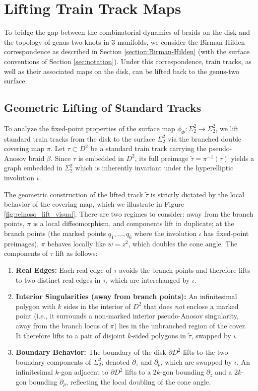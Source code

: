 \section{Lifting Train Track Maps}
\label{sec:lifting train tracks}

To bridge the gap between the combinatorial dynamics of braids on the disk and the topology of genus-two knots in 3-manifolds, we consider the Birman-Hilden correspondence as described in Section \ref{section:Birman-Hilden} (with the surface conventions of Section \ref{sec:notation}). Under this correspondence, train tracks, as well as their associated maps on the disk, can be lifted back to the genus-two surface.

\subsection{Geometric Lifting of Standard Tracks}
To analyze the fixed-point properties of the surface map $\phi_\Phi \colon \Sigma_2^2 \to \Sigma_2^2$, we lift standard train tracks from the disk to the surface $\Sigma_2^2$ via the branched double covering map $\pi$. Let $\tau \subset D^2$ be a standard train track carrying the pseudo-Anosov braid $\beta$. Since $\tau$ is embedded in $D^2$, its full preimage $\tilde{\tau} = \pi^{-1}(\tau)$ yields a graph embedded in $\Sigma_2^2$ which is inherently invariant under the hyperelliptic involution $\iota$.

The geometric construction of the lifted track $\tilde{\tau}$ is strictly dictated by the local behavior of the covering map, which we illustrate in Figure \ref{fig:reinoso_lift_visual}. There are two regimes to consider: away from the branch points, $\pi$ is a local diffeomorphism, and components lift in duplicate; at the branch points (the marked points $q_1, \ldots, q_6$ where the involution $\iota$ has fixed-point preimages), $\pi$ behaves locally like $w = z^2$, which doubles the cone angle. The components of $\tau$ lift as follows:
\begin{enumerate}
    \item \textbf{Real Edges:} Each real edge of $\tau$ avoids the branch points and therefore lifts to two distinct real edges in $\tilde{\tau}$, which are interchanged by $\iota$.
    \item \textbf{Interior Singularities (away from branch points):} An infinitesimal polygon with $k$ sides in the interior of $D^2$ that does \emph{not} enclose a marked point (i.e., it surrounds a non-marked interior pseudo-Anosov singularity, away from the branch locus of $\pi$) lies in the unbranched region of the cover. It therefore lifts to a pair of disjoint $k$-sided polygons in $\tilde{\tau}$, swapped by $\iota$.
    \item \textbf{Boundary Behavior:} The boundary of the disk $\partial D^2$ lifts to the two boundary components of $\Sigma_2^2$, denoted $\partial_z$ and $\partial_p$, which are swapped by $\iota$. An infinitesimal $k$-gon adjacent to $\partial D^2$ lifts to a $2k$-gon bounding $\partial_z$ and a $2k$-gon bounding $\partial_p$, reflecting the local doubling of the cone angle.
\end{enumerate}

